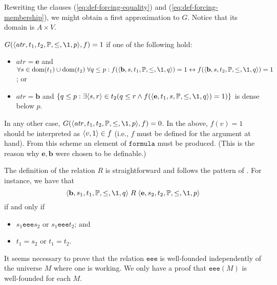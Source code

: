 \documentclass[11pt,english]{article}
\renewcommand{\PP}{\mathbb{P}}
\newcommand{\formula}{\ensuremath{\mathtt{formula}}}
\newcommand{\equ}{\mathbf{e}}
\newcommand{\bel}{\mathbf{b}}
\newcommand{\atr}{\mathit{atr}}
\newcommand{\reee}{\mathrel{\mathtt{eee}}}
\begin{document}
Rewriting the clauses (\ref{eq:def-forcing-equality}) and
(\ref{eq:def-forcing-membership}), we might obtain a first
approximation to $G$. Notice that its domain is $A\times V$.

$G(\lb\atr,t_1,t_2,\PP,\leq,\1,p\rb,f) =1$ if one of the following hold:
\begin{itemize}
\item $\atr=\equ$ and   $\forall s\in\dom(t_1)\cup\dom(t_2)\;\forall q\leq p :
  f(\lb\bel,s,t_1,\PP,\leq,\1,q\rb) =1  \lsii
  f(\lb\bel,s,t_2,\PP,\leq,\1,q\rb) =1$; or
\item $\atr=\bel$ and $\{q\leq p : \exists \lb s,r\rb\in t_2 (q\leq r \y
  f(\lb\equ,t_1,s,\PP,\leq,\1,q\rb) =1)\}$ is dense below $p$.
\end{itemize}
In any other case, $G(\lb\atr,t_1,t_2,\PP,\leq,\1,p\rb,f) =0$. In the
above, $f(v)=1$ should be interpreted as $\langle v,1\rangle\in f$ (i.e., $f$
must be defined for the argument at hand). From this scheme an element
of $\formula$ must be produced. (This is the reason why  $\equ,\bel$
were chosen to be definable.)

The definition of the relation $R$ is straightforward and follows the
pattern of \cite[p.~257]{kunen2011set}. For instance, we have that 
\[
\lb\bel,s_1,t_1,\PP,\leq,\1,q\rb\mathrel{R}
\lb\equ,s_2,t_2,\PP,\leq,\1,p\rb
\]
if and only if 
\begin{itemize}
\item $s_1 \reee  s_2$ or $s_1\reee t_2$; and
\item $t_1 = s_2$ or $t_1 = t_2$.
\end{itemize}
%
\begin{framed}
  It seems necessary to prove that the relation $\reee$ is
  well-founded independently of the universe $M$ where one is
  working. We only
  have a proof that ${\reee}(M)$ is well-founded for each $M$.
\end{framed}
\end{document}

